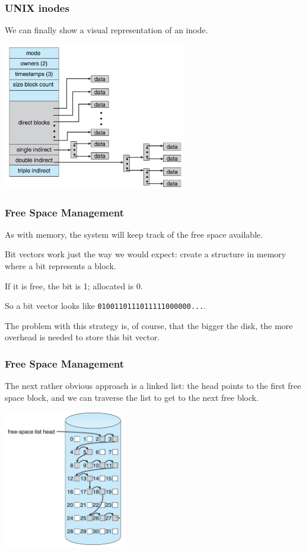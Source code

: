 \begin{frame}
\frametitle{UNIX inodes}

We can finally show a visual representation of an inode.

\begin{center}
	\includegraphics[width=0.6\textwidth]{images/unix-inode.png}
\end{center}


\end{frame}

\begin{frame}
\frametitle{Free Space Management}

As with memory, the system will keep track of the free space available.

Bit vectors work just the way we would expect: create a structure in memory where a bit represents a block. 

If it is free, the bit is 1; allocated is 0. 

So a bit vector looks like \texttt{0100110111011111000000...}. 

The problem with this strategy is, of course, that the bigger the disk, the more overhead is needed to store this bit vector.

\end{frame}

\begin{frame}
\frametitle{Free Space Management}

The next rather obvious approach is a linked list: the head points to the first free space block, and we can traverse the list to get to the next free block. 

\begin{center}
	\includegraphics[width=0.4\textwidth]{images/disk-linked-list.png}
\end{center}


\end{frame}

